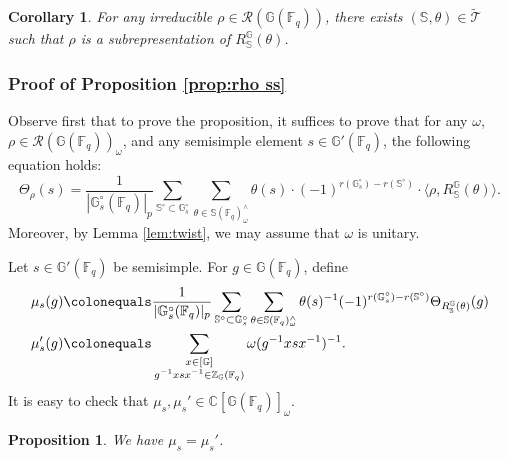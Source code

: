 \documentclass{amsart}
\newcommand{\cT}{\mathcal{T}}
\newcommand{\F}{\mathbb{F}}
\newcommand{\FF}{\mathbb{F}}
\newcommand{\bbC}{\mathbb{C}}
\newcommand{\bbS}{\mathbb{S}}
\newcommand{\bbG}{\mathbb{G}}
\newcommand{\bbZ}{\mathbb{Z}}
\newcommand{\cR}{\mathcal{R}}
\theoremstyle{plain}
\newtheorem{prop}[thm]{Proposition}
\newtheorem{cor}[thm]{Corollary}
\theoremstyle{definition}
\theoremstyle{remark}
\theoremstyle{theorem}
\begin{document}
\begin{cor}\label{cor:exhaustion}
    For any irreducible $\rho \in \cR(\bbG(\FF_q))$, there exists $(\bbS,\theta)\in\tilde{\cT}$ such that $\rho$ is a subrepresentation of $R_{\bbS}^{\bbG}(\theta)$.
\end{cor}



\subsubsection{Proof of Proposition \ref{prop:rho ss}}\label{subsubsec:proof of rho ss}

Observe first that to prove the proposition, it suffices to prove that for any $\omega$, $\rho \in \cR(\bbG(\FF_q))_\omega$, and any semisimple element $s \in \bbG'(\FF_q)$, the following equation holds:
\begin{equation}\label{eq:omega ss}
    \Theta_\rho(s) = \frac{1}{|\bbG_{s}^{\circ}(\F_{q})|_p} \sum_{\bbS^\circ \subset \bbG_{s}^\circ} \sum_{\theta \in \bbS(\FF_q)^\wedge_\omega} \theta(s) \cdot (-1)^{r(\bbG_s^\circ) - r(\bbS^\circ)} \cdot \langle \rho, R_{\bbS}^{\bbG}(\theta) \rangle.
\end{equation}
Moreover, by Lemma \ref{lem:twist}, we may assume that $\omega$ is unitary.

Let $s \in \bbG'(\FF_q)$ be semisimple. For $g \in \bbG(\FF_q)$, define
\begin{align*}
    \mu_s(g) &\colonequals \frac{1}{|\bbG_s^\circ(\FF_q)|_p} \sum_{\bbS^\circ \subset \bbG_s^\circ} \sum_{\theta \in \bbS(\FF_q)^\wedge_\omega} \theta(s)^{-1} (-1)^{r(\bbG_s^\circ) - r(\bbS^\circ)} \Theta_{R_{\bbS}^{\bbG}(\theta)}(g) \\
    \mu_s'(g) &\colonequals \sum_{\substack{x \in [\bbG]\\ g^{-1} xsx^{-1} \in \bbZ_{\bbG}(\FF_q)}} \omega(g^{-1}xsx^{-1})^{-1}.
\end{align*}
It is easy to check that $\mu_s, \mu_s' \in \bbC[\bbG(\FF_q)]_\omega$.


\begin{prop}\label{prop:mu-mu'}
We have $\mu_s = \mu_s'$.
\end{prop}
\end{document}
